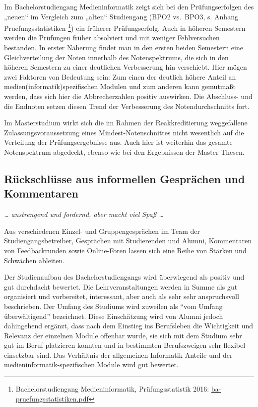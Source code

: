 Im Bachelorstudiengang Medieninformatik zeigt sich bei den
Prüfungserfolgen des „neuen`` im Vergleich zum „alten`` Studiengang
(BPO2 vs.~BPO3, s. Anhang Pruefungsstatistiken \footnote{Bachelorstudiengang
  Medieninformatik, Prüfungsstatistik 2016:
  \href{https://th-koeln.github.io/mi-2017/anhaenge/ba-pruefungsstatistiken.pdf}{ba-pruefungsstatistiken.pdf}})
ein früherer Prüfungserfolg. Auch in höheren Semestern werden die
Prüfungen früher absolviert und mit weniger Fehlversuchen bestanden. In
erster Näherung findet man in den ersten beiden Semestern eine
Gleichverteilung der Noten innerhalb des Notenspektrums, die sich in den
höheren Semestern zu einer deutlichen Verbesserung hin verschiebt. Hier
mögen zwei Faktoren von Bedeutung sein: Zum einen der deutlich höhere
Anteil an medien(informatik)spezifischen Modulen und zum anderen kann
gemutmaßt werden, dass sich hier die Abbrecherzahlen positiv auswirken.
Die Abschluss- und die Endnoten setzen diesen Trend der Verbesserung des
Notendurchschnitts fort.

Im Masterstudium wirkt sich die im Rahmen der Reakkreditierung
weggefallene Zulassungsvoraussetzung eines Mindest-Notenschnittes nicht
wesentlich auf die Verteilung der Prüfungsergebnisse aus. Auch hier ist
weiterhin das gesamte Notenspektrum abgedeckt, ebenso wie bei den
Ergebnissen der Master Thesen.

\subsection{Rückschlüsse aus informellen Gesprächen und
Kommentaren}\label{ruxfcckschluxfcsse-aus-informellen-gespruxe4chen-und-kommentaren}

\emph{\ldots{} anstrengend und fordernd, aber macht viel Spaß \ldots{}}

Aus verschiedenen Einzel- und Gruppengesprächen im Team der
Studiengangsbetreiber, Gesprächen mit Studierenden und Alumni,
Kommentaren von Feedbackrunden sowie Online-Foren lassen sich eine Reihe
von Stärken und Schwächen ableiten.

Der Studienaufbau des Bachelorstudiengangs wird überwiegend als positiv
und gut durchdacht bewertet. Die Lehrveranstaltungen werden in Summe als
gut organisiert und vorbereitet, interessant, aber auch als sehr sehr
anspruchsvoll beschrieben. Der Umfang des Studiums wird zuweilen als
``vom Umfang überwältigend'' bezeichnet. Diese Einschätzung wird von
Alumni jedoch dahingehend ergänzt, dass nach dem Einstieg ins
Berufsleben die Wichtigkeit und Relevanz der einzelnen Module offenbar
wurde, sie sich mit dem Studium sehr gut im Beruf platzieren konnten und
in bestimmten Berufszweigen sehr flexibel einsetzbar sind. Das
Verhältnis der allgemeinen Informatik Anteile und der
medieninformatik-spezifischen Module wird gut bewertet.


